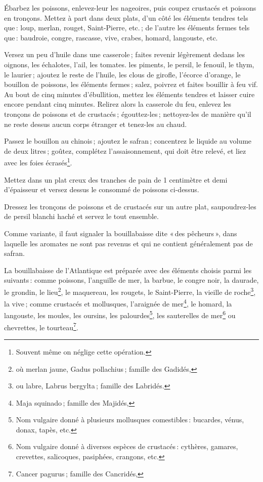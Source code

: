 Ébarbez les poissons, enlevez-leur les nageoires, puis coupez crustacés et
poissons en tronçons. Mettez à part dans deux plats, d'un côté les éléments
tendres tels que : loup, merlan, rouget, Saint-Pierre, etc. ; de l'autre les
éléments fermes tels que : baudroie, congre, rascasse, vive, crabes, homard,
langouste, etc.

Versez un peu d'huile dans une casserole ; faites revenir légèrement dedans les
oignons, les échalotes, l'ail, les tomates. les piments, le persil, le fenouil,
le thym, le laurier ; ajoutez le reste de l'huile, les clous de girofle,
l'écorce d'orange, le bouillon de poissons, les éléments fermes ; salez,
poivrez et faites bouillir à feu vif. Au bout de cinq minutes d'ébullition,
mettez les éléments tendres et laisser cuire encore pendant cinq minutes.
Relirez alors la casserole du feu, enlevez les tronçons de poissons et de
crustacés ; égouttez-les ; nettoyez-les de manière qu'il ne reste dessus aucun
corps étranger et tenez-les au chaud.

Passez le bouillon au chinois ; ajoutez le safran ; concentrez le liquide au
volume de deux litres ; goûtez, complétez l’assaisonnement, qui doit être
relevé, et liez avec les foies écrasés\footnote{Souvent même on néglige cette opération.}. 

Mettez dans un plat creux des tranches de pain de 1 centimètre et demi
d’épaisseur et versez dessus le consommé de poissons ci-dessus.

Dressez les tronçons de poissons et de crustacés sur un autre plat,
saupoudrez-les de persil blanchi haché et servez le tout ensemble.

\sk

Comme variante, il faut signaler la bouillabaisse dite « des pêcheurs », dans
laquelle les aromates ne sont pas revenus et qui ne contient généralement pas
de safran.

\sk

La bouillabaisse de l'Atlantique est préparée avec des éléments choisis parmi
les suivants : comme poissons, l'anguille de mer, la barbue, le congre noir, la
daurade, le grondin, le lieu\footnote{où merlan jaune, Gadus pollachius ;
famille des Gadidés,}, le maquereau, les rougets, le Saint-Pierre, la vieille
de roche\footnote{ou labre, Labrus bergylta ; famille des Labridés.}, la vive ;
comme crustacés et mollusques, l’araignée de mer\footnote{Maja squinado ;
famille des Majidés,}, le homard, la langouste, les moules, les oursins, les
palourdes\footnote{Nom vulgaire donné à plusieurs mollusques comestibles :
bucardes, vénus, donax, tapès, etc.}, les sauterelles de mer\footnote{Nom
vulgaire donné à diverses espèces de crustacés : cythères, gamares, crevettes,
salicoques, pasiphées, crangons, etc.} ou chevrettes, le
tourteau\footnote{Cancer pagurus ; famille des Cancridés,}.


